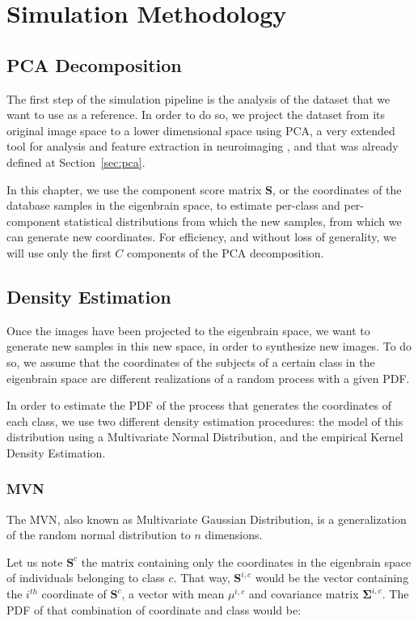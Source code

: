 \section{Simulation Methodology}
\subsection{\acs{PCA} Decomposition}
The first step of the simulation pipeline is the analysis of the dataset that we want to use as a reference. In order to do so, we project the dataset from its original image space to a lower dimensional space using \ac{PCA}, a very extended tool for analysis and feature extraction in neuroimaging \cite{Illan2011,Khedher2015}, and that was already defined at Section~\ref{sec:pca}.

In this chapter, we use the component score matrix $\mathbf{S}$, or the coordinates of the database samples in the eigenbrain space, to estimate per-class and per-component statistical distributions from which the new samples, from which we can generate new coordinates. For efficiency, and without loss of generality, we will use only the first $C$ components of the \ac{PCA} decomposition. 

\subsection{Density Estimation}
Once the images have been projected to the eigenbrain space, we want to generate new samples in this new space, in order to synthesize new images. To do so, we assume that the coordinates of the subjects of a certain class in the eigenbrain space are different realizations of a random process with a given \ac{PDF}. 

In order to estimate the \ac{PDF} of the process that generates the coordinates of each class, we use two different density estimation procedures: the model of this distribution using a Multivariate Normal Distribution, and the empirical Kernel Density Estimation. 

\subsubsection{\acf{MVN}}
The \acf{MVN}, also known as Multivariate Gaussian Distribution, is a generalization of the random normal distribution to $n$ dimensions. 

Let us note $\mathbf{S}^{c}$ the matrix containing only the coordinates in the eigenbrain space of individuals belonging to class $c$. That way, $\mathbf{S}^{i,c}$ would be the vector containing the $i^{th}$ coordinate of $\mathbf{S}^{c}$, a vector with mean $\mu^{i,c}$ and covariance matrix $\boldsymbol{\Sigma}^{i,c}$. The \ac{PDF} of that combination of coordinate and class would be: 

